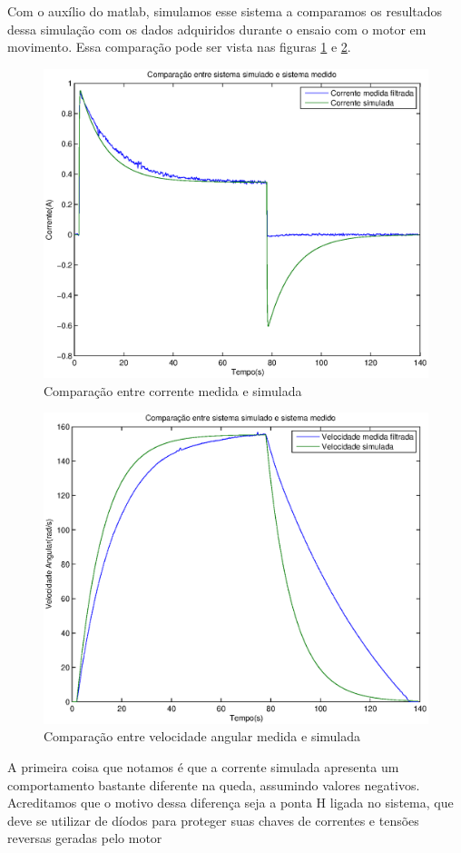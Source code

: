 \documentclass{article}
\begin{document}
Com o auxílio do matlab, simulamos esse sistema a comparamos os resultados dessa simulação com os dados adquiridos durante o ensaio com o motor em movimento. Essa comparação pode ser vista nas figuras \ref{fig:simi} e \ref{fig:simv}.
\begin{figure}[H]
	\centering
	\includegraphics[width=0.8\linewidth]{../simi}
	\caption{Comparação entre corrente medida e simulada}
	\label{fig:simi}
\end{figure}
\begin{figure}[H]
	\centering
	\includegraphics[width=0.8\linewidth]{../simv}
	\caption{Comparação entre velocidade angular medida e simulada}
	\label{fig:simv}
\end{figure}

A primeira coisa que notamos é que a corrente simulada apresenta um comportamento bastante diferente na queda, assumindo valores negativos. Acreditamos que o motivo dessa diferença seja a ponta H ligada no sistema, que deve se utilizar de díodos para proteger suas chaves de correntes e tensões reversas geradas pelo motor

\begin{thebibliography}{widestlabel}
\end{thebibliography}
\end{document}
